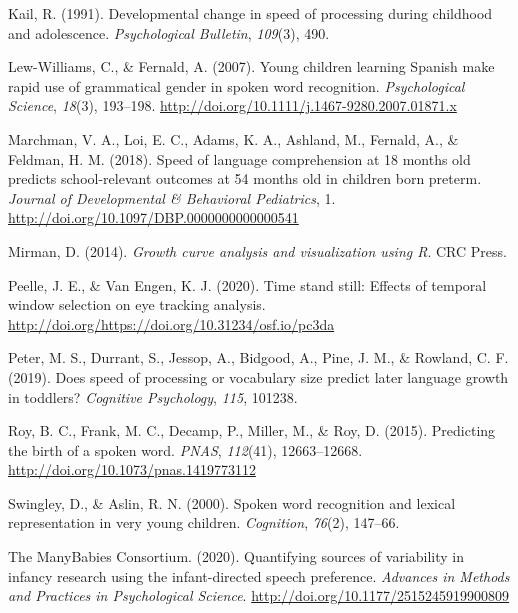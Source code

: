 \documentclass[10pt, letterpaper]{article}
\begin{document}
\leavevmode\hypertarget{ref-kail1991}{}%
Kail, R. (1991). Developmental change in speed of processing during
childhood and adolescence. \emph{Psychological Bulletin}, \emph{109}(3),
490.

\leavevmode\hypertarget{ref-Lew-Williams2007}{}%
Lew-Williams, C., \& Fernald, A. (2007). Young children learning Spanish
make rapid use of grammatical gender in spoken word recognition.
\emph{Psychological Science}, \emph{18}(3), 193--198.
\url{http://doi.org/10.1111/j.1467-9280.2007.01871.x}

\leavevmode\hypertarget{ref-Marchman2018}{}%
Marchman, V. A., Loi, E. C., Adams, K. A., Ashland, M., Fernald, A., \&
Feldman, H. M. (2018). Speed of language comprehension at 18 months old
predicts school-relevant outcomes at 54 months old in children born
preterm. \emph{Journal of Developmental \& Behavioral Pediatrics}, 1.
\url{http://doi.org/10.1097/DBP.0000000000000541}

\leavevmode\hypertarget{ref-Mirman2014}{}%
Mirman, D. (2014). \emph{Growth curve analysis and visualization using
R}. CRC Press.

\leavevmode\hypertarget{ref-Peelle2020}{}%
Peelle, J. E., \& Van Engen, K. J. (2020). Time stand still: Effects of
temporal window selection on eye tracking analysis.
\url{http://doi.org/https://doi.org/10.31234/osf.io/pc3da}

\leavevmode\hypertarget{ref-peter2019}{}%
Peter, M. S., Durrant, S., Jessop, A., Bidgood, A., Pine, J. M., \&
Rowland, C. F. (2019). Does speed of processing or vocabulary size
predict later language growth in toddlers? \emph{Cognitive Psychology},
\emph{115}, 101238.

\leavevmode\hypertarget{ref-Roy2015}{}%
Roy, B. C., Frank, M. C., Decamp, P., Miller, M., \& Roy, D. (2015).
Predicting the birth of a spoken word. \emph{PNAS}, \emph{112}(41),
12663--12668. \url{http://doi.org/10.1073/pnas.1419773112}

\leavevmode\hypertarget{ref-Swingley2000}{}%
Swingley, D., \& Aslin, R. N. (2000). Spoken word recognition and
lexical representation in very young children. \emph{Cognition},
\emph{76}(2), 147--66.

\leavevmode\hypertarget{ref-TheManyBabiesConsortium2020}{}%
The ManyBabies Consortium. (2020). Quantifying sources of variability in
infancy research using the infant-directed speech preference.
\emph{Advances in Methods and Practices in Psychological Science}.
\url{http://doi.org/10.1177/2515245919900809}


\end{document}
